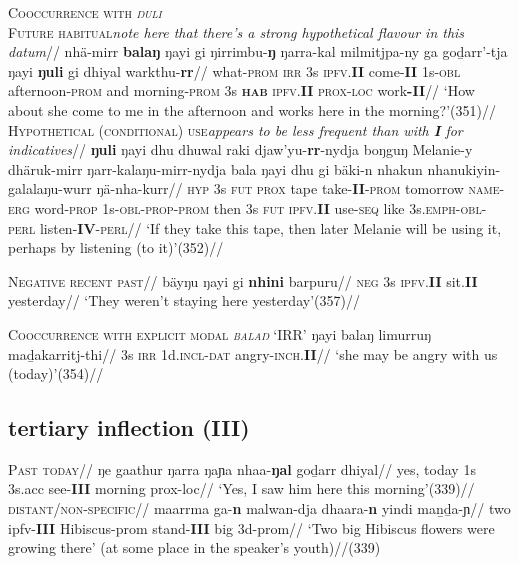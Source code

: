 \documentclass[12pt]{article}
\begin{document}
\pex \textsc{Cooccurrence with \textit{ŋuli}}\\
\a\begingl\glpreamble\textsc{Future habitual}\hfill\textit{note here that there's a strong hypothetical flavour in this datum}//
\gla nhä-mirr \textbf{balaŋ} ŋayi gi ŋirrimbu-\textbf{ŋ} ŋarra-kal milmitjpa-ny ga goḏarr'-tja ŋayi \textbf{ŋuli} gi dhiyal warkthu-\textbf{rr}//
\glb what-\textsc{prom} \textsc{irr} 3s \textsc{ipfv.\textbf{II}} come-\textbf{II} 1s-\textsc{obl} afternoon\textsc{-prom} and morning\textsc{-prom} 3s \textsc{\textbf{hab}} \textsc{ipfv.\textbf{II}} \textsc{prox-loc} work\textbf{-II}//
\glft`How about she come to me in the afternoon and works here in the morning?'\hfill(351)//
\endgl
\a\begingl\glpreamble\textsc{Hypothetical (conditional) use}\hfill\textit{appears to be less frequent than with \textbf{I} for indicatives}//
\gla \textbf{ŋuli} ŋayi dhu dhuwal raki djaw'yu-\textbf{rr}-nydja boŋguŋ Melanie-y dhäruk-mirr ŋarr-kalaŋu-mirr-nydja bala ŋayi dhu gi bäki-n nhakun nhanukiyin-galalaŋu-wurr ŋä-nha-kurr//
\glb \textsc{hyp} 3s \textsc{fut} \textsc{prox} tape take-\textbf{II}-\textsc{prom} tomorrow \textsc{name-erg} word\textsc{-prop} 1s\textsc{-obl-prop-prom} then 3s \textsc{fut} \textsc{ipfv.\textbf{II}} use\textsc{-seq} like 3s\textsc{.emph-obl-perl} listen\textsc{-\textbf{IV}-perl}//
\glft`If they take this tape, then later Melanie will be using it, perhaps by listening (to it)'\hfill(352)//\endgl
\xe

\pex\begingl{}\glpreamble \textsc{Negative recent past}//
\gla bäyŋu ŋayi gi \textbf{nhini} barpuru//
\glb \textsc{neg} 3s \textsc{ipfv.\textbf{II}} sit.\textbf{II} yesterday//
\glft`They weren't staying here yesterday'\hfill(357)//\endgl\xe

\pex\textsc{Cooccurrence with explicit modal \textit{balaŋ} `IRR'}
\a\begingl
\gla ŋayi balaŋ limurruŋ maḏakarritj-thi//
\glb3s \textsc{irr} 1d\textsc{.incl-dat} angry\textsc{-inch.\textbf{II}}//
\glft`she may be angry with us (today)'\hfill(354)//
\endgl
\xe
\subsection{tertiary inflection (III)}
\pex\textsc{Past}
\a{}\begingl\glpreamble\textsc{today}//
\gla ŋe gaathur ŋarra ŋaɲa nhaa-\textbf{ŋal} goḏarr dhiyal//
\glb	yes, today 1s 3s{\sc.acc} see-\textbf{III} morning {\sc prox-loc}//
\glft`Yes, I saw him here this morning'\hfill(339)//\endgl
\a{}\begingl\glpreamble\textsc{distant/non-specific}//
\gla maarrma ga-\textbf{n} malwan-dja dhaara-\textbf{n} yindi maṉḏa-ɲ//
\glb two {\sc ipfv-\textbf{III}} Hibiscus-{\sc prom} stand-\textbf{III} big 3d-{\sc prom}//
\glft`Two big Hibiscus flowers were growing there' (at some place in the speaker's youth)//\hfill(339)
\endgl\xe
\end{document}
